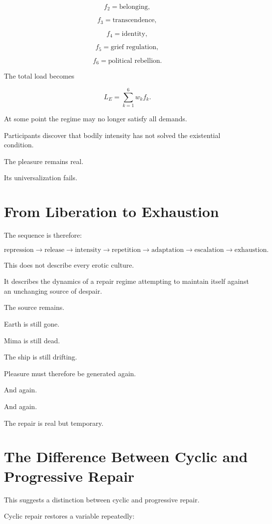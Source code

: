 \documentclass[11pt,oneside]{book}
\theoremstyle{definition}
\theoremstyle{remark}
\begin{document}
\[
f_2=\text{belonging},
\]

\[
f_3=\text{transcendence},
\]

\[
f_4=\text{identity},
\]

\[
f_5=\text{grief regulation},
\]

\[
f_6=\text{political rebellion}.
\]

The total load becomes

\[
L_E
=
\sum_{k=1}^{6}w_k f_k.
\]

At some point the regime may no longer satisfy all demands.

Participants discover that bodily intensity has not solved the existential condition.

The pleasure remains real.

Its universalization fails.

\section{From Liberation to Exhaustion}

The sequence is therefore:

\[
\text{repression}
\rightarrow
\text{release}
\rightarrow
\text{intensity}
\rightarrow
\text{repetition}
\rightarrow
\text{adaptation}
\rightarrow
\text{escalation}
\rightarrow
\text{exhaustion}.
\]

This does not describe every erotic culture.

It describes the dynamics of a repair regime attempting to maintain itself against an unchanging source of despair.

The source remains.

Earth is still gone.

Mima is still dead.

The ship is still drifting.

Pleasure must therefore be generated again.

And again.

And again.

The repair is real but temporary.

\section{The Difference Between Cyclic and Progressive Repair}

This suggests a distinction between cyclic and progressive repair.

Cyclic repair restores a variable repeatedly:
\end{document}
